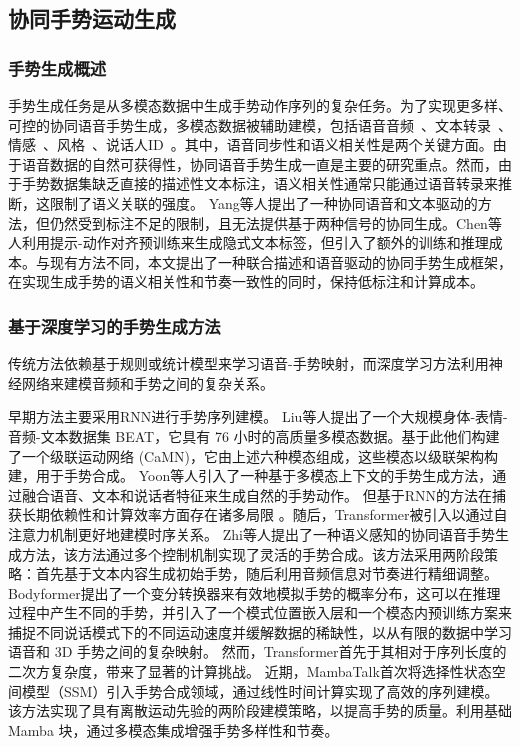 \subsection{协同手势运动生成}

\subsubsection{手势生成概述}
手势生成任务是从多模态数据中生成手势动作序列的复杂任务。为了实现更多样、可控的协同语音手势生成，多模态数据被辅助建模，包括语音音频~\cite{yang2023diffusestylegesture, yang2023unifiedgesture,xu2025mambatalk}、文本转录~\cite{zhi2023livelyspeaker, pang2023bodyformer,liu2024emage}、情感~\cite{qi2024emotiongesture, qi2024weakly}、风格~\cite{ao2023gesturediffuclip, yang2023diffusestylegesture, ghorbani2023zeroeggs}、说话人ID~\cite{yang2023diffusestylegesture+}。其中，语音同步性和语义相关性是两个关键方面。由于语音数据的自然可获得性，协同语音手势生成一直是主要的研究重点。然而，由于手势数据集缺乏直接的描述性文本标注，语义相关性通常只能通过语音转录来推断，这限制了语义关联的强度。
Yang等人\cite{yang2024freetalker}提出了一种协同语音和文本驱动的方法，但仍然受到标注不足的限制，且无法提供基于两种信号的协同生成。Chen等人\cite{chen2024syntalker}利用提示-动作对齐预训练来生成隐式文本标签，但引入了额外的训练和推理成本。与现有方法不同，本文提出了一种联合描述和语音驱动的协同手势生成框架，在实现生成手势的语义相关性和节奏一致性的同时，保持低标注和计算成本。

\subsubsection{基于深度学习的手势生成方法}
传统方法依赖基于规则或统计模型来学习语音-手势映射，而深度学习方法利用神经网络来建模音频和手势之间的复杂关系\cite{nyatsanga2023comprehensive}。

早期方法主要采用RNN\cite{liu2022beat,yoon2020speech}进行手势序列建模。
Liu等人\cite{liu2022beat}提出了一个大规模身体-表情-音频-文本数据集 BEAT，它具有 76 小时的高质量多模态数据。基于此他们构建了一个级联运动网络 (CaMN)，它由上述六种模态组成，这些模态以级联架构构建，用于手势合成。
Yoon等人\cite{yoon2020speech}引入了一种基于多模态上下文的手势生成方法，通过融合语音、文本和说话者特征来生成自然的手势动作。
但基于RNN的方法在捕获长期依赖性和计算效率方面存在诸多局限
。随后，Transformer\cite{zhi2023livelyspeaker, pang2023bodyformer}被引入以通过自注意力机制更好地建模时序关系。
Zhi等人\cite{zhi2023livelyspeaker}提出了一种语义感知的协同语音手势生成方法，该方法通过多个控制机制实现了灵活的手势合成。该方法采用两阶段策略：首先基于文本内容生成初始手势，随后利用音频信息对节奏进行精细调整。
Bodyformer\cite{pang2023bodyformer}提出了一个变分转换器来有效地模拟手势的概率分布，这可以在推理过程中产生不同的手势，并引入了一个模式位置嵌入层和一个模态内预训练方案来捕捉不同说话模式下的不同运动速度并缓解数据的稀缺性，以从有限的数据中学习语音和 3D 手势之间的复杂映射。
然而，Transformer首先于其相对于序列长度的二次方复杂度，带来了显著的计算挑战。
近期，MambaTalk\cite{xu2025mambatalk}首次将选择性状态空间模型（SSM）引入手势合成领域，通过线性时间计算实现了高效的序列建模。该方法实现了具有离散运动先验的两阶段建模策略，以提高手势的质量。利用基础 Mamba 块，通过多模态集成增强手势多样性和节奏。

